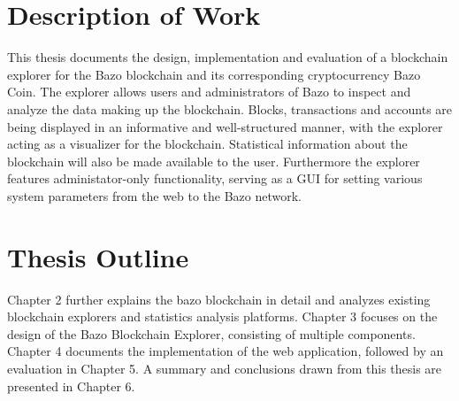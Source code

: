 \section{Description of Work}
This thesis documents the design, implementation and evaluation of a blockchain explorer for the Bazo blockchain and its corresponding cryptocurrency Bazo Coin. The explorer allows users and administrators of Bazo to inspect and analyze the data making up the blockchain. Blocks, transactions and accounts are being displayed in an informative and well-structured manner, with the explorer acting as a visualizer for the blockchain. Statistical information about the blockchain will also be made available to the user. Furthermore the explorer features administator-only functionality, serving as a GUI for setting various system parameters from the web to the Bazo network.

\section{Thesis Outline}
Chapter 2 further explains the bazo blockchain in detail and analyzes existing blockchain explorers and statistics analysis platforms. Chapter 3 focuses on the design of the Bazo Blockchain Explorer, consisting of multiple components. Chapter 4 documents the implementation of the web application, followed by an evaluation in Chapter 5. A summary and conclusions drawn from this thesis are presented in Chapter 6.